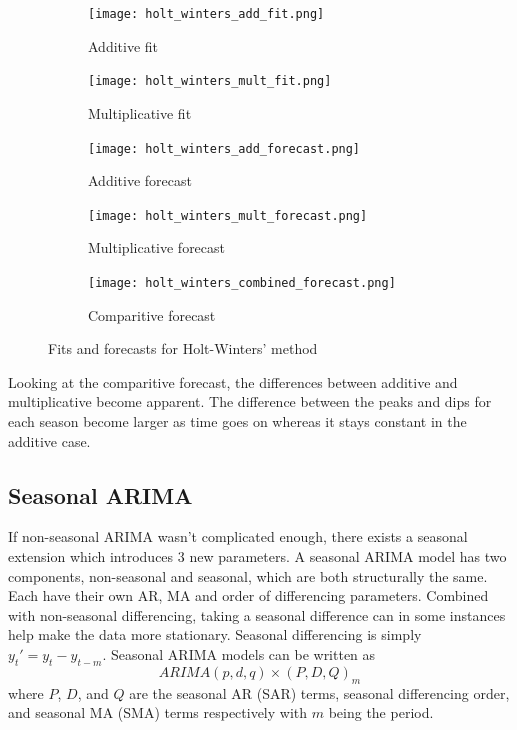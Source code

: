 \documentclass{article}
\begin{document}
  \begin{figure}[H]
    \centering
    \begin{subfigure}[b]{0.49\linewidth}
      \texttt{[image: holt\_winters\_add\_fit.png]}
       \caption{Additive fit}
    \end{subfigure}
    \begin{subfigure}[b]{0.49\linewidth}
      \texttt{[image: holt\_winters\_mult\_fit.png]}
      \caption{Multiplicative fit}
    \end{subfigure}
    \begin{subfigure}[b]{0.49\linewidth}
      \texttt{[image: holt\_winters\_add\_forecast.png]}
       \caption{Additive forecast}
    \end{subfigure}
    \begin{subfigure}[b]{0.49\linewidth}
      \texttt{[image: holt\_winters\_mult\_forecast.png]}
      \caption{Multiplicative forecast}
    \end{subfigure}
    \begin{subfigure}[b]{0.75\linewidth}
      \texttt{[image: holt\_winters\_combined\_forecast.png]}
      \caption{Comparitive forecast}
    \end{subfigure}
    \caption{Fits and forecasts for Holt-Winters' method}
  \end{figure}

  Looking at the comparitive forecast, the differences between additive and multiplicative become apparent. The difference between the peaks and dips for each season become larger as time goes on whereas it stays constant in the additive case.

  \newpage
  \subsection{Seasonal ARIMA}
  If non-seasonal ARIMA wasn't complicated enough, there exists a seasonal extension which introduces 3 new parameters. A seasonal ARIMA model has two components, non-seasonal and seasonal, which are both structurally the same. Each have their own AR, MA and order of differencing parameters. Combined with non-seasonal differencing, taking a seasonal difference can in some instances help make the data more stationary. Seasonal differencing is simply $y_t' = y_t - y_{t-m}$. Seasonal ARIMA models can be written as 
  \begin{equation*}
    ARIMA(p,d,q)\times(P,D,Q)_m
  \end{equation*}
  where $P$, $D$, and $Q$ are the seasonal AR (SAR) terms, seasonal differencing order, and seasonal MA (SMA) terms respectively with $m$ being the period.
\end{document}
